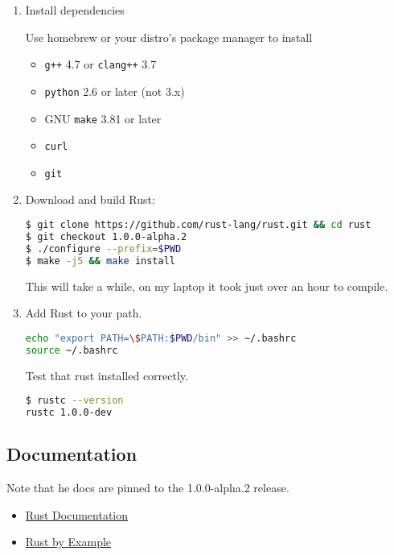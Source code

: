 \begin{enumerate}
\def\labelenumi{\arabic{enumi}.}
\item
  Install dependencies

  Use homebrew or your distro's package manager to install

  \begin{itemize}
  \itemsep1pt\parskip0pt
  \item
    \lstinline!g++! 4.7 or \lstinline!clang++! 3.7
  \item
    \lstinline!python! 2.6 or later (not 3.x)
  \item
    GNU \lstinline!make! 3.81 or later
  \item
    \lstinline!curl!
  \item
    \lstinline!git!
  \end{itemize}
\item
  Download and build Rust:

\begin{lstlisting}[language=sh]
$ git clone https://github.com/rust-lang/rust.git && cd rust
$ git checkout 1.0.0-alpha.2
$ ./configure --prefix=$PWD
$ make -j5 && make install
\end{lstlisting}

  This will take a while, on my laptop it took just over an hour to
  compile.
\item
  Add Rust to your path.

\begin{lstlisting}[language=sh]
echo "export PATH=\$PATH:$PWD/bin" >> ~/.bashrc
source ~/.bashrc
\end{lstlisting}

  Test that rust installed correctly.

\begin{lstlisting}[language=sh]
$ rustc --version
rustc 1.0.0-dev
\end{lstlisting}
\end{enumerate}

\subsection{Documentation}\label{documentation}

Note that he docs are pinned to the 1.0.0-alpha.2 release.

\begin{itemize}
\itemsep1pt\parskip0pt
\item
  \href{http://doc.rust-lang.org/1.0.0-alpha.2/index.html}{Rust
  Documentation}
\item
  \href{http://rustbyexample.com/}{Rust by Example}
\end{itemize}

